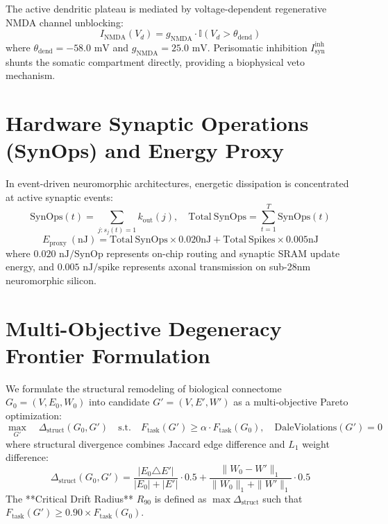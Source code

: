 \documentclass[11pt,letterpaper]{report}
\begin{document}
The active dendritic plateau is mediated by voltage-dependent regenerative NMDA channel unblocking:
\begin{equation}
I_{\mathrm{NMDA}}(V_d) = g_{\mathrm{NMDA}} \cdot \mathbb{I}(V_d > \theta_{\mathrm{dend}})
\end{equation}
where $\theta_{\mathrm{dend}} = -58.0\text{ mV}$ and $g_{\mathrm{NMDA}} = 25.0\text{ mV}$. Perisomatic inhibition $I_{\mathrm{syn}}^{\mathrm{inh}}$ shunts the somatic compartment directly, providing a biophysical veto mechanism.

\section{Hardware Synaptic Operations (SynOps) and Energy Proxy}
In event-driven neuromorphic architectures, energetic dissipation is concentrated at active synaptic events:
\begin{equation}
\mathrm{SynOps}(t) = \sum_{j: s_j(t)=1} k_{\mathrm{out}}(j), \quad \mathrm{Total\ SynOps} = \sum_{t=1}^T \mathrm{SynOps}(t)
\end{equation}
\begin{equation}
E_{\mathrm{proxy}}\ (\mathrm{nJ}) = \mathrm{Total\ SynOps} \times 0.020\mathrm{ nJ} + \mathrm{Total\ Spikes} \times 0.005\mathrm{ nJ}
\end{equation}
where $0.020\text{ nJ/SynOp}$ represents on-chip routing and synaptic SRAM update energy, and $0.005\text{ nJ/spike}$ represents axonal transmission on sub-28nm neuromorphic silicon.

\section{Multi-Objective Degeneracy Frontier Formulation}
We formulate the structural remodeling of biological connectome $G_0 = (V, E_0, W_0)$ into candidate $G' = (V, E', W')$ as a multi-objective Pareto optimization:
\begin{equation}
\max_{G'} \quad \Delta_{\mathrm{struct}}(G_0, G') \quad \text{s.t.} \quad F_{\mathrm{task}}(G') \ge \alpha \cdot F_{\mathrm{task}}(G_0), \quad \mathrm{DaleViolations}(G') = 0
\end{equation}
where structural divergence combines Jaccard edge difference and $L_1$ weight difference:
\begin{equation}
\Delta_{\mathrm{struct}}(G_0, G') = \frac{|E_0 \triangle E'|}{|E_0| + |E'|} \cdot 0.5 + \frac{\|W_0 - W'\|_1}{\|W_0\|_1 + \|W'\|_1} \cdot 0.5
\end{equation}
The **Critical Drift Radius** $R_{90}$ is defined as $\max \Delta_{\mathrm{struct}}$ such that $F_{\mathrm{task}}(G') \ge 0.90 \times F_{\mathrm{task}}(G_0)$.
\end{document}
